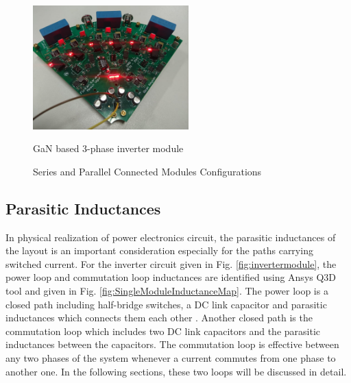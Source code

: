 \begin{figure}
\begin{minipage}[b]{.4\linewidth}
\centering
\includegraphics[width=6cm]{figures/invertermodule.jpg}
\caption{GaN based 3-phase inverter module}
\label{fig:invertermodule}
\end{minipage}%
\begin{minipage}[b]{.6\linewidth}
\centering
{}\quad
{}
\caption{Series and Parallel Connected Modules Configurations}
\label{fig:ModuleConnections}
\end{minipage}
\end{figure}

\subsection{Parasitic Inductances}

In physical realization of power electronics circuit, the parasitic inductances of the layout is an important consideration especially for the paths carrying switched current.
For the inverter circuit given in Fig. \ref{fig:invertermodule}, the power loop and commutation loop inductances are identified using Ansys Q3D tool and given in Fig. \ref{fig:SingleModuleInductanceMap}. The power loop is a closed path including half-bridge switches, a DC link capacitor and parasitic inductances which connects them each other . Another closed path is the commutation loop which includes two DC link capacitors and the parasitic inductances between the capacitors. The commutation loop is effective between any two phases of the system whenever a current commutes from one phase to another one. In the following sections, these two loops will be discussed in detail.

